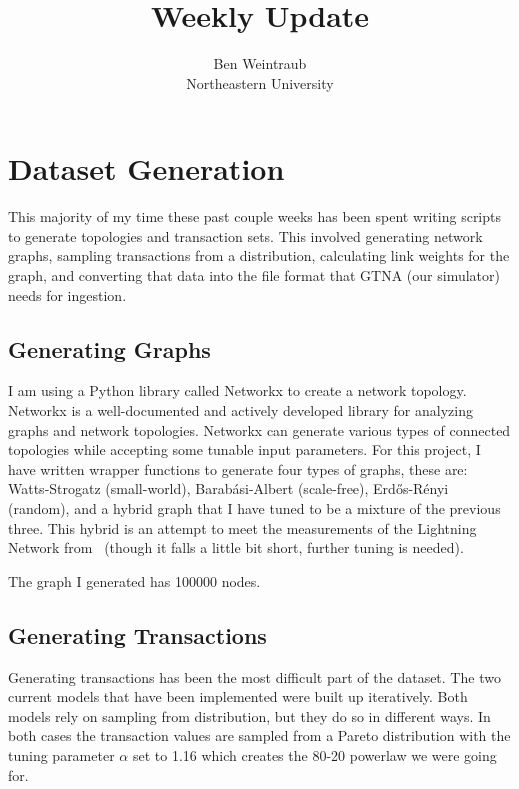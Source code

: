\documentclass{article}
\theoremstyle{definition}
\begin{document}
\title{Weekly Update}

\author{
  {\rm Ben Weintraub}\\
  Northeastern University
}
\maketitle


\section*{Dataset Generation}
This majority of my time these past couple weeks has been spent writing scripts to generate topologies and transaction sets. This involved generating network graphs, sampling transactions from a distribution, calculating link weights for the graph, and converting that data into the file format that GTNA (our simulator) needs for ingestion.

\subsection*{Generating Graphs}
I am using a Python library called Networkx to create a network topology. Networkx is a well-documented and actively developed library for analyzing graphs and network topologies. Networkx can generate various types of connected topologies while accepting some tunable input parameters. For this project, I have written wrapper functions to generate four types of graphs, these are: Watts-Strogatz (small-world), Barab\'{a}si-Albert (scale-free), Erd\H{o}s-R\'{e}nyi (random), and a hybrid graph that I have tuned to be a mixture of the previous three. This hybrid is an attempt to meet the measurements of the Lightning Network from~\cite{rohrer2019discharged} (though it falls a little bit short, further tuning is needed).

The graph I generated has 100000 nodes.

\subsection*{Generating Transactions}
Generating transactions has been the most difficult part of the dataset. The two current models that have been implemented were built up iteratively. Both models rely on sampling from distribution, but they do so in different ways. In both cases the transaction values are sampled from a Pareto distribution with the tuning parameter $\alpha$ set to 1.16 which creates the 80-20 powerlaw we were going for.
\end{document}
